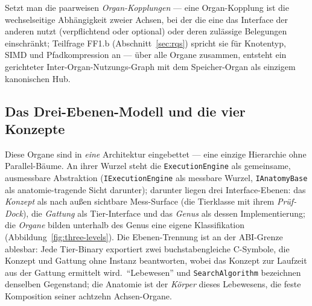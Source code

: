 \begin{nurlang}
\begin{figure}[htbp]
\end{figure}
\end{nurlang}
\begin{nurkurz}
Setzt man die paarweisen \emph{Organ-Kopplungen} --- eine Organ-Kopplung ist die wechselseitige Abhängigkeit
zweier Achsen, bei der die eine das Interface der anderen nutzt (verpflichtend oder optional) oder deren
zulässige Belegungen einschränkt; Teilfrage FF1.b (Abschnitt~\ref{sec:rqs}) spricht sie für Knotentyp, SIMD
und Pfadkompression an --- über alle Organe zusammen, entsteht ein gerichteter Inter-Organ-Nutzungs-Graph mit
dem Speicher-Organ als einzigem kanonischen Hub.
\subsection{Das Drei-Ebenen-Modell und die vier Konzepte}\label{sec:anatomy-levels}
Diese Organe sind in \emph{eine} Architektur eingebettet --- eine einzige Hierarchie ohne Parallel-Bäume. An
ihrer Wurzel steht die \texttt{ExecutionEngine} als gemeinsame, ausmessbare Abstraktion
(\texttt{IExecutionEngine} als messbare Wurzel, \texttt{IAnatomyBase} als anatomie-tragende Sicht darunter);
darunter liegen drei Interface-Ebenen: das \emph{Konzept} als nach außen sichtbare Mess-Surface (die
Tierklasse mit ihrem \emph{Prüf-Dock}), die \emph{Gattung} als Tier-Interface und das \emph{Genus} als
dessen Implementierung; die \emph{Organe} bilden unterhalb des Genus eine eigene Klassifikation
(Abbildung~\ref{fig:three-levels}). Die Ebenen-Trennung ist an der ABI-Grenze ablesbar:
Jede Tier-Binary exportiert zwei buchstabengleiche C-Symbole, die Konzept und Gattung ohne Instanz beantworten,
wobei das Konzept zur Laufzeit aus der Gattung ermittelt wird.\ \enquote{Lebewesen} und \texttt{SearchAlgorithm} bezeichnen
denselben Gegenstand; die Anatomie ist der \emph{Körper} dieses Lebewesens, die feste Komposition seiner
achtzehn Achsen-Organe.
\begin{figure}[htbp]\centering
{}
\end{figure}
\end{nurkurz}
